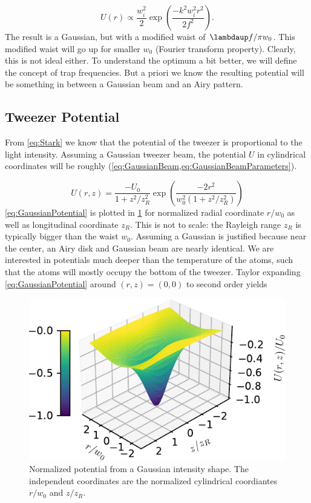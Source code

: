 \begin{equation}\label{eq:GaussianCase}
    U(r) \propto \frac{w_i^2}{2} \exp{\left(\frac{-k^2w_i^2 r^2}{2f^2}\right)}.
\end{equation}
The result is a Gaussian, but with a modified waist of $\lambdaup f / \pi w_0$.
This modified waist will go up for smaller $w_0$ (Fourier transform property). 
Clearly, this is not ideal either. 
To understand the optimum a bit better, we will define the concept of trap frequencies. 
But a priori we know the resulting potential will be something in between a Gaussian beam and an Airy pattern. 

\subsection{Tweezer Potential}

From \cref{eq:Stark} we know that the potential of the tweezer is proportional to the light intensity. 
Assuming a Gaussian tweezer beam, the potential $U$ in cylindrical coordinates will be roughly (\cref{eq:GaussianBeam,eq:GaussianBeamParameters}).

\begin{equation}\label{eq:GaussianPotential}
    U(r,z)=\frac{-U_{0}}{1+z^{2} / z_{R}^{2}} \exp \left(\frac{-2 r^{2}}{w_{0}^{2}\left(1+z^{2} / z_{R}^{2}\right)}\right)
\end{equation}
\cref{eq:GaussianPotential} is plotted in \cref{fig:GaussianPotential} for normalized radial coordinate $r/w_0$ as well as longitudinal coordinate $z_R$. 
This is not to scale: the Rayleigh range $z_R$ is typically bigger than the waist $w_0$.
Assuming a Gaussian is justified because near the center, an Airy disk and Gaussian beam are nearly identical.
We are interested in potentials much deeper than the temperature of the atoms, such that the atoms will mostly occupy the bottom of the tweezer. 
Taylor expanding \cref{eq:GaussianPotential} around $(r,z)=(0,0)$ to second order yields 

\begin{figure}
    \centering
    \includegraphics[width=.56\linewidth]{figures/GaussianPotential.pdf}
    \caption{Normalized potential from a Gaussian intensity shape. The independent coordinates are the normalized cylindrical coordiantes $r/w_0$ and $z/z_R$.}
    \label{fig:GaussianPotential}
\end{figure}

